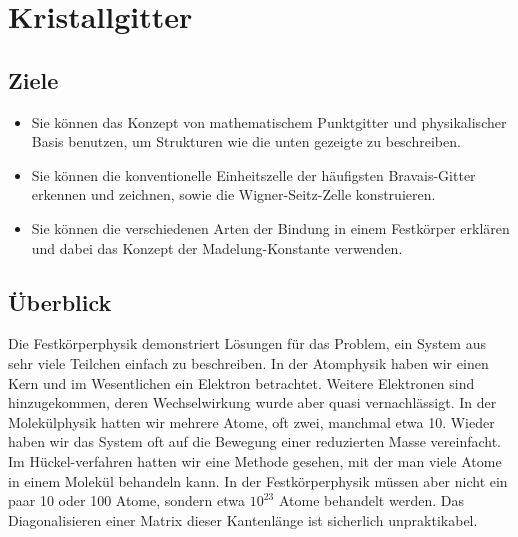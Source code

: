 
\chapter{Kristallgitter}





\section{Ziele}

\begin{itemize}

\item Sie können das Konzept von mathematischem Punktgitter und physikalischer Basis benutzen, um Strukturen wie die unten gezeigte zu beschreiben.

\item Sie können die konventionelle Einheitszelle der häufigsten Bravais-Gitter erkennen und zeichnen, sowie die Wigner-Seitz-Zelle konstruieren.

\item Sie können die verschiedenen Arten der Bindung in einem Festkörper erklären und dabei das Konzept der Madelung-Konstante verwenden.

\end{itemize}


\begin{figure}
\end{figure}



\section{Überblick}

Die Festkörperphysik demonstriert Lösungen für das Problem, ein System aus sehr viele Teilchen einfach zu beschreiben. In der Atomphysik haben wir einen Kern und im Wesentlichen ein Elektron betrachtet. Weitere Elektronen sind hinzugekommen, deren Wechselwirkung wurde aber quasi vernachlässigt. In der Molekülphysik hatten wir mehrere Atome, oft zwei, manchmal etwa 10. Wieder haben wir das System oft auf die Bewegung einer reduzierten Masse vereinfacht. Im Hückel-verfahren hatten wir eine Methode gesehen, mit der man viele Atome in einem Molekül behandeln kann. In der Festkörperphysik müssen aber nicht ein paar 10 oder 100 Atome, sondern etwa $10^{23}$ Atome behandelt werden. Das Diagonalisieren einer Matrix dieser Kantenlänge ist sicherlich unpraktikabel.

